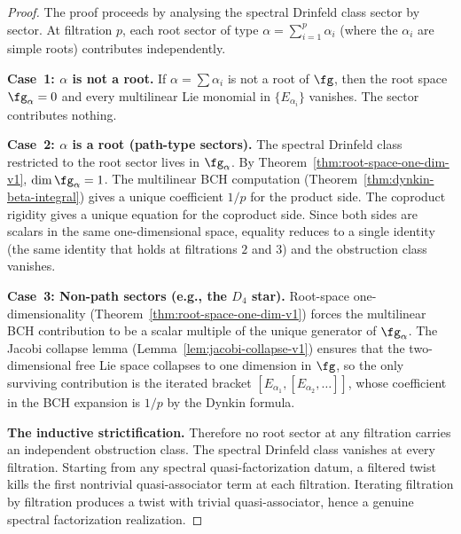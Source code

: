 \begin{proof}
The proof proceeds by analysing the spectral Drinfeld class sector by
sector. At filtration $p$, each root sector of type
$\alpha=\sum_{i=1}^p\alpha_i$ (where the $\alpha_i$ are simple roots)
contributes independently.

\medskip\noindent\textbf{Case~1: $\alpha$ is not a root.}
If $\alpha=\sum\alpha_i$ is not a root of $\fg$, then the root space
$\fg_\alpha=0$ and every multilinear Lie monomial in
$\{E_{\alpha_i}\}$ vanishes. The sector contributes nothing.

\medskip\noindent\textbf{Case~2: $\alpha$ is a root (path-type
sectors).}
The spectral Drinfeld class restricted to the root sector lives in
$\fg_\alpha$. By Theorem~\ref{thm:root-space-one-dim-v1},
$\dim\fg_\alpha=1$. The multilinear BCH computation
(Theorem~\ref{thm:dynkin-beta-integral}) gives a unique coefficient
$1/p$ for the product side. The coproduct rigidity gives a unique
equation for the coproduct side. Since both sides are scalars in the
same one-dimensional space, equality reduces to a single identity
(the same identity that holds at filtrations $2$ and $3$) and the
obstruction class vanishes.

\medskip\noindent\textbf{Case~3: Non-path sectors (e.g., the $D_4$
star).}
Root-space one-dimensionality
(Theorem~\ref{thm:root-space-one-dim-v1}) forces the multilinear
BCH contribution to be a scalar multiple of the unique generator of
$\fg_\alpha$. The Jacobi collapse lemma
(Lemma~\ref{lem:jacobi-collapse-v1}) ensures that the
two-dimensional free Lie space collapses to one dimension in
$\fg$, so the only surviving contribution is the iterated bracket
$[E_{\alpha_1},[E_{\alpha_2},\ldots]]$, whose coefficient in the
BCH expansion is $1/p$ by the Dynkin formula.

\medskip\noindent\textbf{The inductive strictification.}
Therefore no root sector at any filtration carries an independent
obstruction class. The spectral Drinfeld class vanishes at every
filtration. Starting from any spectral quasi-factorization datum, a
filtered twist kills the first nontrivial quasi-associator term at
each filtration. Iterating filtration by filtration produces a twist
with trivial quasi-associator, hence a genuine spectral factorization
realization.
\end{proof}

